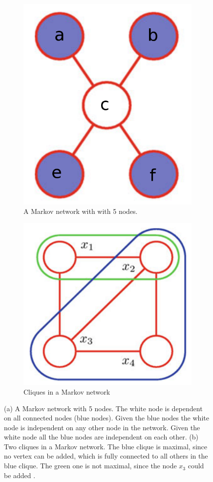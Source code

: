 \begin{figure}
	\centering
	\begin{subfigure}[t]{.5\textwidth}
  		\centering
  		\includegraphics[width=.5\linewidth]{imgs/markovnet1.png}
  		\caption{A Markov network with with 5 nodes.}
  		\label{fig:markovnet1}
	\end{subfigure}%
	\begin{subfigure}[t]{.5\textwidth}
  		\centering
  		\includegraphics[width=.5\linewidth]{imgs/markovnet2.png}
  		\caption{Cliques in a Markov network}
  		\label{fig:markovnet2}
	\end{subfigure}
	\caption[A Markov network with 5 nodes.]{(a) A Markov network with 5 nodes. The white node is dependent on all connected nodes (blue nodes). Given the blue nodes the white node is independent on any other node in the network. Given the white node all the blue nodes are independent on each other. (b) Two cliques in a Markov network. The blue clique is maximal, since no vertex can be added, which is fully connected to all others in the blue clique. The green one is not maximal, since the node $x_3$ could be added \cite{bishop2013pattern}.}
	\label{fig:markovnet}
\end{figure}


